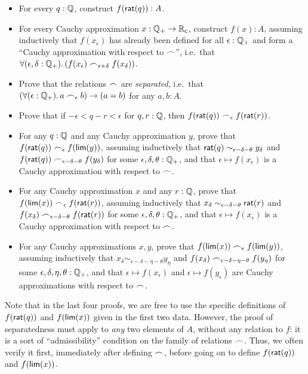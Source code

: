 \begin{itemize}
\item For every $q : \mathbb{Q}$, construct $f(\mathsf{rat}(q)) : A$.
\item For every Cauchy approximation $x : \mathbb{Q}_{+} \to \mathbb{R}_\mathsf{c}$, construct $f(x) : A$, assuming inductively that $f(x_\epsilon)$ has already been defined for all $\epsilon : \mathbb{Q}_{+}$ and form a ``Cauchy approximation with respect to $\frown$'', i.e.\ that $\fall{\epsilon,\delta:\Qp} (f(x_\epsilon) \bsim_{\epsilon+\delta} f(x_\delta))$.
\item Prove that the relations $\frown$ are \emph{separated}, i.e.\ that $(\fall{\epsilon:\Qp} a\bsim_\epsilon b) \to (a=b)$ for any $a,b:A$.
\item Prove that if $-\epsilon< q-r <\epsilon$ for $q,r:\mathbb{Q}$, then $f(\mathsf{rat}(q))\frown_\epsilon f(\mathsf{rat}(r))$.
\item For any $q:\mathbb{Q}$ and any Cauchy approximation $y$, prove that $f(\mathsf{rat}(q)) \frown_\epsilon f(\mathsf{lim}(y))$, assuming inductively that $\mathsf{rat}(q)\sim_{\epsilon-\delta-\theta} y_\delta$ and $f(\mathsf{rat}(q)) \frown_{\epsilon-\delta-\theta} f(y_\delta)$ for some $\epsilon,\delta,\theta:\mathbb{Q}_{+}$, and that $\epsilon\mapsto f(x_\epsilon)$ is a Cauchy approximation with respect to $\frown$.
\item For any Cauchy approximation $x$ and any $r:\mathbb{Q}$, prove that $f(\mathsf{lim}(x)) \frown_\epsilon f(\mathsf{rat}(r))$, assuming inductively that $x_\delta \sim_{\epsilon-\delta-\theta} \mathsf{rat}(r)$ and $f(x_\delta) \frown_{\epsilon-\delta-\theta} f(\mathsf{rat}(r))$ for some $\epsilon,\delta,\theta:\mathbb{Q}_{+}$, and that $\epsilon\mapsto f(x_\epsilon)$ is a Cauchy approximation with respect to $\frown$.
\item For any Cauchy approximations $x,y$, prove that $f(\mathsf{lim}(x)) \frown_\epsilon f(\mathsf{lim}(y))$, assuming inductively that $x_\delta \sim_{\epsilon-\delta-\eta-\theta} y_\eta$ and $f(x_\delta) \frown_{\epsilon-\delta-\eta-\theta} f(y_\eta)$ for some $\epsilon,\delta,\eta,\theta:\mathbb{Q}_{+}$, and that $\epsilon\mapsto f(x_\epsilon)$ and $\epsilon\mapsto f(y_\epsilon)$ are Cauchy approximations with respect to $\frown$.
\end{itemize}
Note that in the last four proofs, we are free to use the specific definitions of $f(\mathsf{rat}(q))$ and $f(\mathsf{lim}(x))$ given in the first two data.
However, the proof of separatedness must apply to \emph{any} two elements of $A$, without any relation to $f$: it is a sort of ``admissibility'' condition on the family of relations $\frown$.
Thus, we often verify it first, immediately after defining $\frown$, before going on to define $f(\mathsf{rat}(q))$ and $f(\mathsf{lim}(x))$.

